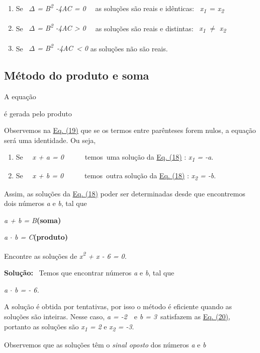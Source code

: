\begin{enumerate}
	\item Se~ \textit{$ \Delta $  = B\textsuperscript{2} -4AC = 0~~ }as soluções são reais e idênticas:~ \textit{x\textsubscript{1}}~=  \textit{x\textsubscript{2}}

	\item Se~ \textit{$ \Delta $  = B\textsuperscript{2} -4AC > 0~~ }as soluções são reais e distintas:~ \textit{x\textsubscript{1}} $ \neq $  \textit{x\textsubscript{2}}

	\item Se~ \textit{$ \Delta $  = B\textsuperscript{2}~-4AC~< 0   }as soluções não são reais.
\end{enumerate}

\subsection{Método do produto e soma}

A equação


é gerada pelo produto


Observemos na \hyperref[eqc:4.19]{Eq. (19)} que se os termos entre parênteses forem nulos, a equação será uma identidade. Ou seja,

\begin{enumerate}
	\item Se~~ \textit{x + a = 0}~~~~~~temos~uma solução da \hyperref[eqc:4.18]{Eq. (18)} :   \textit{x\textsubscript{1} = -a}.

	\item Se~~ \textit{x + b = 0}~~~~~~temos~outra solução da \hyperref[eqc:4.18]{Eq. (18)} :   \textit{x\textsubscript{2} = -b}.
\end{enumerate}

Assim, as soluções da \hyperref[eqc:4.18]{Eq. (18)} poder ser determinadas desde que encontremos dois números \textit{a} e \textit{b}, tal que

\textit{a + b = B\quad \quad }\textbf{(soma)}

\textit{a $ \cdot $   b = C\quad \quad }\textbf{(produto)}

\begin{texemplo}
Encontre as soluções de \textit{x\textsuperscript{2} + x - 6 = 0.}

\textbf{Solução:}~ Temos que encontrar números \textit{a} e \textit{b}, tal que


\textit{a $ \cdot $   b = - 6. }

A solução é obtida por tentativas, por isso o método é eficiente quando as soluções são inteiras. Nesse caso, \textit{a = -2}~~e  \textit{b = 3}~satisfazem as \hyperref[eqc:4.20]{Eq. (20)}, portanto as soluções são  \textit{x\textsubscript{1} = 2} e  \textit{x\textsubscript{2} = -3}.

Observemos que as soluções têm o \textit{sinal oposto} dos números \textit{a }e\textit{ b} \qedsymbol{}
\end{texemplo}

